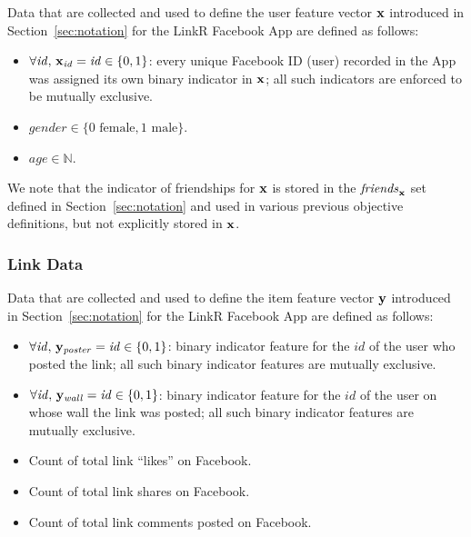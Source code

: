 Data that are collected and used to define the user feature vector
$\mathbf{x}$ introduced in Section~\ref{sec:notation} for the LinkR Facebook
App are defined as follows:
\begin{itemize}
\item $\forall \mathit{id}, \, \mathbf{x}_\mathit{id} = \mathit{id} \in \{ 0, 1 \}$: 
every unique Facebook ID (user) recorded in the App was assigned its own
binary indicator in $\mathbf{x}$; all such indicators are enforced to be
mutually exclusive.
\item $\mathit{gender} \in \{ 0 \mbox{ female}, 1 \mbox{ male} \}$.
\item $\mathit{age} \in \mathbb{N}$.
\end{itemize}
We note that the indicator of friendships for $\mathbf{x}$ is stored in the
$\mathit{friends}_{\mathbf{x}}$ set defined in Section~\ref{sec:notation} and
used in various previous objective definitions, but not explicitly 
stored in $\mathbf{x}$.

\subsubsection{Link Data}

Data that are collected and used to define the item feature vector
$\mathbf{y}$ introduced in Section~\ref{sec:notation} for the LinkR Facebook
App are defined as follows:
\begin{itemize}
\item $\forall \mathit{id}, \, \mathbf{y}_\mathit{poster} = \mathit{id} \in \{ 0, 1 \}$:  
binary indicator feature for the $\mathit{id}$ of the user who posted the link;
all such binary indicator features are mutually exclusive.
\item $\forall \mathit{id}, \, \mathbf{y}_\mathit{wall} = \mathit{id} \in \{ 0, 1 \}$:
binary indicator feature for the $\mathit{id}$ of the user on whose wall the link was posted; all such binary indicator features are mutually exclusive.
\item Count of total link ``likes'' on Facebook.
\item Count of total link shares on Facebook.
\item Count of total link comments posted on Facebook.
\end{itemize}

